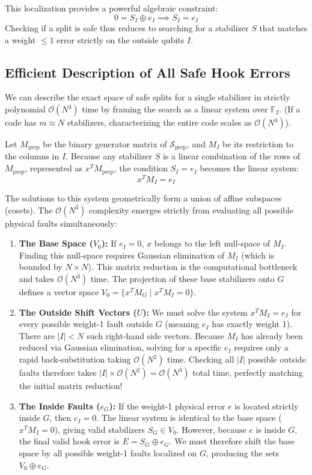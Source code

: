 \documentclass[11pt]{article}
\begin{document}
This localization provides a powerful algebraic constraint:
\begin{equation}
    0 = S_I \oplus e_I \implies S_I = e_I
\end{equation}
Checking if a split is safe thus reduces to searching for a stabilizer $S$ that matches a weight $\le 1$ error strictly on the outside qubits $I$. 

\subsection{Efficient Description of All Safe Hook Errors}

We can describe the exact space of safe splits for a single stabilizer in strictly polynomial $\mathcal{O}(N^3)$ time by framing the search as a linear system over $\mathbb{F}_2$. (If a code has $m \approx N$ stabilizers, characterizing the entire code scales as $\mathcal{O}(N^4)$).

Let $M_{\text{prep}}$ be the binary generator matrix of $\mathcal{S}_{\text{prep}}$, and $M_I$ be its restriction to the columns in $I$.
Because any stabilizer $S$ is a linear combination of the rows of $M_{\text{prep}}$, represented as $x^T M_{\text{prep}}$, the condition $S_I = e_I$ becomes the linear system:
\begin{equation}
    x^T M_I = e_I
\end{equation}

The solutions to this system geometrically form a union of affine subspaces (cosets). The $\mathcal{O}(N^3)$ complexity emerges strictly from evaluating all possible physical faults simultaneously:
\begin{enumerate}
    \item \textbf{The Base Space ($V_0$):} If $e_I = 0$, $x$ belongs to the left null-space of $M_I$. Finding this null-space requires Gaussian elimination of $M_I$ (which is bounded by $N \times N$). This matrix reduction is the computational bottleneck and takes $\mathcal{O}(N^3)$ time. The projection of these base stabilizers onto $G$ defines a vector space $V_0 = \{ x^T M_G \mid x^T M_I = 0 \}$. 
    \item \textbf{The Outside Shift Vectors ($U$):} We must solve the system $x^T M_I = e_I$ for every possible weight-1 fault outside $G$ (meaning $e_I$ has exactly weight 1). There are $|I| < N$ such right-hand side vectors. Because $M_I$ has already been reduced via Gaussian elimination, solving for a specific $e_I$ requires only a rapid back-substitution taking $\mathcal{O}(N^2)$ time. Checking all $|I|$ possible outside faults therefore takes $|I| \times \mathcal{O}(N^2) = \mathcal{O}(N^3)$ total time, perfectly matching the initial matrix reduction!
    \item \textbf{The Inside Faults ($e_G$):} If the weight-1 physical error $e$ is located strictly inside $G$, then $e_I = 0$. The linear system is identical to the base space ($x^T M_I = 0$), giving valid stabilizers $S_G \in V_0$. However, because $e$ is inside $G$, the final valid hook error is $E = S_G \oplus e_G$. We must therefore shift the base space by all possible weight-1 faults localized on $G$, producing the sets $V_0 \oplus e_G$.
\end{enumerate}
\end{document}
